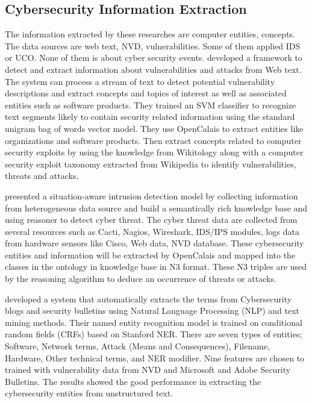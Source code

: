 \subsection{Cybersecurity Information Extraction}
\label{cybersecuie}
The information extracted by these researches are computer entities, concepts. The data sources are web text, NVD, vulnerabilities. Some of them applied IDS or UCO. None of them is about cyber security events. \cite{mulwad2011} developed a framework to detect and extract information about vulnerabilities and attacks from Web text. The system can process a stream of text to detect potential vulnerability descriptions and extract concepts and topics of interest as well as associated entities such as software products. They trained an SVM classifier to recognize text segments likely to contain security related information using the standard unigram bag of words vector model. They use OpenCalais to extract entities like organizations and software products. Then extract concepts related to computer security exploits by using the knowledge from Wikitology along with a computer security exploit taxonomy extracted from Wikipedia to identify vulnerabilities, threats and attacks.

\cite{more2012} presented a situation-aware intrusion detection model by collecting information from heterogeneous data source and build a semantically rich knowledge base and using reasoner to detect cyber threat. The cyber threat data are collected from several resources such as Cacti, Nagios, Wireshark, IDS/IPS modules, logs data from hardware sensors like Cisco, Web data, NVD database. These cybersecurity entities and information will be extracted by OpenCalais and mapped into the classes in the ontology in knowledge base in N3 format. These N3 triples are used by the reasoning algorithm to deduce an occurrence of threats or attacks. 

\cite{lal2013} developed a system that automatically extracts the terms from Cybersecurity blogs and security bulletins using Natural Language Processing (NLP) and text mining methods. Their named entity recognition model is trained on conditional random fields (CRFs) based on Stanford NER. There are seven types of entities; Software, Network terms, Attack (Means and Consequences), Filename, Hardware, Other technical terms, and NER modifier. Nine features are chosen to trained with vulnerability data from NVD and Microsoft and Adobe Security Bulletins. The results showed the good performance in extracting the cybersecurity entities from unstructured text.

